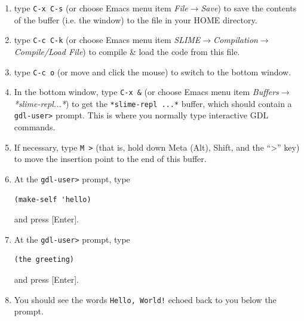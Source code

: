 \documentclass [11pt]{book}
\begin{document}
\begin{enumerate}
\begin{figure}
\begin{lrbox}{\boxedverb}
\begin{minipage}{\linewidth}
\begin{verbatim}
 (in-package :gdl-user)

 (define-object hello ()

   :computed-slots 
   ((greeting "Hello, World!")))

\end{verbatim}
\end{minipage}
\end{lrbox}
\fbox{\usebox{\boxedverb}}

\caption{Example of Simple Object Definition}

\label{fig:simpleobjectdefinition}

\end{figure}

\item type \texttt{C-x C-s} (or choose Emacs menu item \emph{File$\rightarrow$Save}) to save the contents of the buffer (i.e. the window) 
to the file in your HOME directory.

\item type \texttt{C-c C-k} (or choose Emacs menu item \emph{SLIME$\rightarrow$Compilation$\rightarrow$Compile/Load File}) to compile \& load the code from this file.

\item type \texttt{C-c o} (or move and click the mouse)  to switch to the bottom window.

\item In the bottom window, type \texttt{C-x \&} (or choose Emacs menu item \emph{Buffers$\rightarrow$*slime-repl...*}) to get the \texttt{*slime-repl ...*} buffer, which should contain a \texttt{gdl-user>} prompt. This is where you normally type interactive GDL commands.

\item If necessary, type \texttt{M \textgreater} (that is, hold down Meta (Alt), Shift, and the ``\textgreater'' key) to
move the insertion point to the end of this buffer.

\item At the \texttt{gdl-user>} prompt, type 

\begin{verbatim}(make-self 'hello)
\end{verbatim} and press [Enter].

\item At the \texttt{gdl-user>} prompt, type 

\begin{verbatim}(the greeting)
\end{verbatim} and press [Enter].

\item You should see the words \texttt{Hello, World!} echoed back to you below the prompt.

\end{enumerate}
\end{document}

